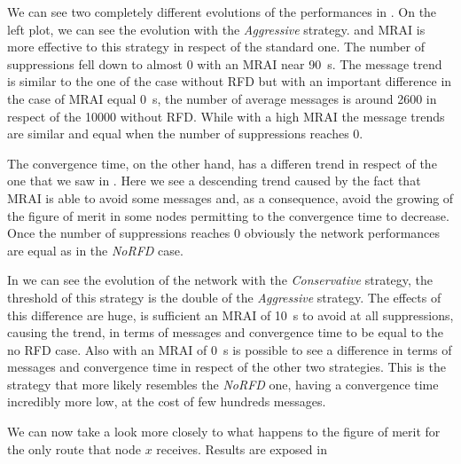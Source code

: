 We can see two completely different evolutions of the performances in .
On the left plot, we can see the evolution with the \textit{Aggressive} strategy.
and \ac{MRAI} is more effective to this strategy in respect of the standard one.
The number of suppressions fell down to almost \num{0} with an \ac{MRAI} near 
\SI{90}{\second}.
The message trend is similar to the one of the case without \ac{RFD} but with an
important difference in the case of  \ac{MRAI} equal \SI{0}{\second}, the number
of average messages is around \num{2600} in respect of the \num{10000} without
\ac{RFD}.
While with a high \ac{MRAI} the message trends are similar and equal when the number of
suppressions reaches \num{0}.

The convergence time, on the other hand, has a differen trend in respect of 
the one that we saw in .
Here we see a descending trend caused by the fact that \ac{MRAI} is able to avoid
some messages and, as a consequence, avoid the growing of the figure of merit in 
some nodes permitting to the convergence time to decrease.
Once the number of suppressions reaches \num{0} obviously the network performances
are equal as in the \textit{NoRFD} case.

In  we can see the evolution of the network with the 
\textit{Conservative} strategy, the threshold of this strategy is the double of
the \textit{Aggressive} strategy.
The effects of this difference are huge, is sufficient an \ac{MRAI} of \SI{10}{\second}
to avoid at all suppressions, causing the trend, in terms of messages and
convergence time to be equal to the no \ac{RFD} case.
Also with an \ac{MRAI} of \SI{0}{\second} is possible to see a difference in 
terms of messages and convergence time in respect of the other two strategies.
This is the strategy that more likely resembles the \textit{NoRFD} one,
having a convergence time incredibly more low, at the cost of few hundreds messages.

We can now take a look more closely to what happens to the figure of merit 
for the only route that node $x$ receives.
Results are exposed in 

